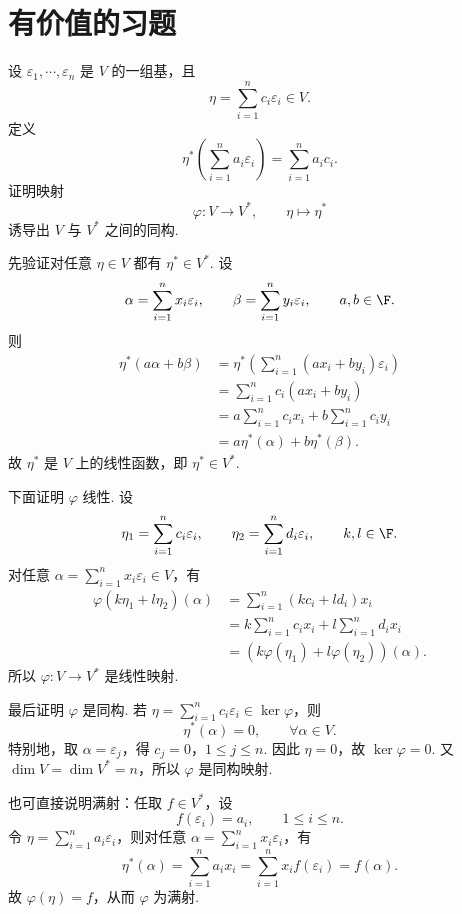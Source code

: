 \section{有价值的习题}

\begin{problem}\label{习题7}
	
	设 $\varepsilon_1,\cdots,\varepsilon_n$ 是 $V$ 的一组基，且
	\[
	\eta=\sum_{i=1}^n c_i\varepsilon_i\in V.
	\]
	定义
	\[
	\eta^*\left(\sum_{i=1}^n a_i\varepsilon_i\right)=\sum_{i=1}^n a_ic_i.
	\]
	证明映射
	\[
	\varphi:V\longrightarrow V^*,\qquad \eta\longmapsto \eta^*
	\]
	诱导出 $V$ 与 $V^*$ 之间的同构.
\end{problem}

\begin{solution}
	先验证对任意 $\eta\in V$ 都有 $\eta^*\in V^*$. 设
	\[
	\alpha=\sum_{i=1}^n x_i\varepsilon_i,
	\qquad
	\beta=\sum_{i=1}^n y_i\varepsilon_i,
	\qquad a,b\in\F.
	\]
	则
	\[
	\begin{aligned}
		\eta^*(a\alpha+b\beta)
		&=\eta^*\left(\sum_{i=1}^n(ax_i+by_i)\varepsilon_i\right)  \\
		&=\sum_{i=1}^n c_i(ax_i+by_i)  \\
		&=a\sum_{i=1}^n c_ix_i+b\sum_{i=1}^n c_iy_i  \\
		&=a\eta^*(\alpha)+b\eta^*(\beta).
	\end{aligned}
	\]
	故 $\eta^*$ 是 $V$ 上的线性函数，即 $\eta^*\in V^*$.
	
	下面证明 $\varphi$ 线性. 设
	\[
	\eta_1=\sum_{i=1}^n c_i\varepsilon_i,
	\qquad
	\eta_2=\sum_{i=1}^n d_i\varepsilon_i,
	\qquad k,l\in\F.
	\]
	对任意 $\alpha=\sum_{i=1}^n x_i\varepsilon_i\in V$，有
	\[
	\begin{aligned}
		\varphi(k\eta_1+l\eta_2)(\alpha)
		&=\sum_{i=1}^n(kc_i+ld_i)x_i \\
		&=k\sum_{i=1}^n c_ix_i+l\sum_{i=1}^n d_ix_i \\
		&=(k\varphi(\eta_1)+l\varphi(\eta_2))(\alpha).
	\end{aligned}
	\]
	所以 $\varphi:V\to V^*$ 是线性映射.
	
	最后证明 $\varphi$ 是同构. 若 $\eta=\sum_{i=1}^n c_i\varepsilon_i\in\ker\varphi$，则
	\[
	\eta^*(\alpha)=0,\qquad \forall \alpha\in V.
	\]
	特别地，取 $\alpha=\varepsilon_j$，得 $c_j=0$，$1\le j\le n$. 因此 $\eta=0$，故 $\ker\varphi=0$.
	又 $\dim V=\dim V^*=n$，所以 $\varphi$ 是同构映射.
	
	也可直接说明满射：任取 $f\in V^*$，设
	\[
	f(\varepsilon_i)=a_i,
	\qquad 1\le i\le n.
	\]
	令 $\eta=\sum_{i=1}^n a_i\varepsilon_i$，则对任意 $\alpha=\sum_{i=1}^n x_i\varepsilon_i$，有
	\[
	\eta^*(\alpha)=\sum_{i=1}^n a_ix_i
	=\sum_{i=1}^n x_if(\varepsilon_i)=f(\alpha).
	\]
	故 $\varphi(\eta)=f$，从而 $\varphi$ 为满射.
\end{solution}


